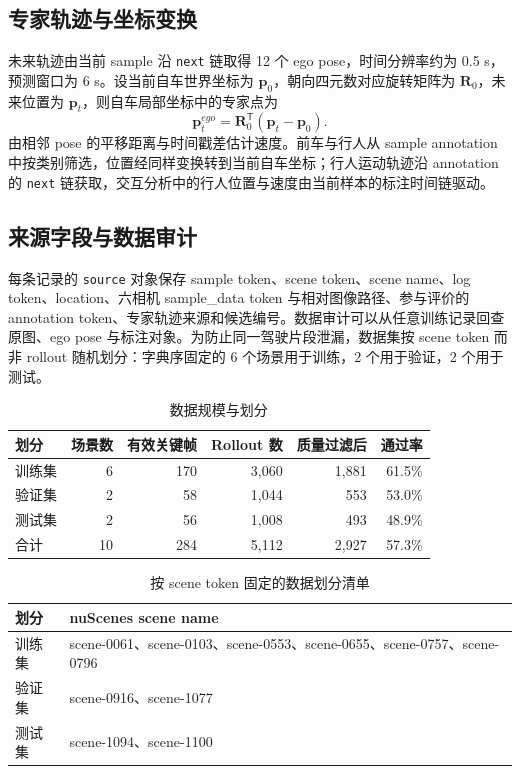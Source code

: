 \documentclass[UTF8,a4paper,12pt,fontset=fandol]{ctexart}
\begin{document}
\subsection{专家轨迹与坐标变换}
未来轨迹由当前 sample 沿 \texttt{next} 链取得 12 个 ego pose，时间分辨率约为 0.5 s，预测窗口为 6 s。设当前自车世界坐标为 $\mathbf{p}_0$，朝向四元数对应旋转矩阵为 $\mathbf{R}_0$，未来位置为 $\mathbf{p}_t$，则自车局部坐标中的专家点为
\begin{equation}
  \mathbf{p}^{ego}_t = \mathbf{R}_0^{\mathsf T}(\mathbf{p}_t-\mathbf{p}_0).
\end{equation}
由相邻 pose 的平移距离与时间戳差估计速度。前车与行人从 sample annotation 中按类别筛选，位置经同样变换转到当前自车坐标；行人运动轨迹沿 annotation 的 \texttt{next} 链获取，交互分析中的行人位置与速度由当前样本的标注时间链驱动。

\subsection{来源字段与数据审计}
每条记录的 \texttt{source} 对象保存 sample token、scene token、scene name、log token、location、六相机 sample\_data token 与相对图像路径、参与评价的 annotation token、专家轨迹来源和候选编号。数据审计可以从任意训练记录回查原图、ego pose 与标注对象。为防止同一驾驶片段泄漏，数据集按 scene token 而非 rollout 随机划分：字典序固定的 6 个场景用于训练，2 个用于验证，2 个用于测试。

\begin{table}[!htbp]
\centering\small
\caption{数据规模与划分}
\begin{tabular}{lrrrrr}
\toprule
划分 & 场景数 & 有效关键帧 & Rollout 数 & 质量过滤后 & 通过率 \\
\midrule
训练集 & 6 & 170 & 3,060 & 1,881 & 61.5\% \\
验证集 & 2 & 58 & 1,044 & 553 & 53.0\% \\
测试集 & 2 & 56 & 1,008 & 493 & 48.9\% \\
合计 & 10 & 284 & 5,112 & 2,927 & 57.3\% \\
\bottomrule
\end{tabular}
\end{table}

\begin{table}[!htbp]
\centering\small
\caption{按 scene token 固定的数据划分清单}
\begin{tabular}{lP{0.74\textwidth}}
\toprule
划分 & nuScenes scene name \\
\midrule
训练集 & scene-0061、scene-0103、scene-0553、scene-0655、scene-0757、scene-0796 \\
验证集 & scene-0916、scene-1077 \\
测试集 & scene-1094、scene-1100 \\
\bottomrule
\end{tabular}
\end{table}
\end{document}
